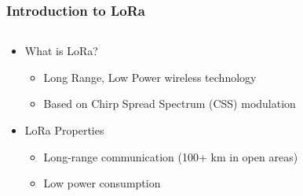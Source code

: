 \documentclass[aspectratio=169]{beamer}
\begin{document}
\begin{frame}[t]
\begin{columns}
\begin{column}{0.33\textwidth}
{      }
    \end{column}
  \end{columns}
\end{frame}

\begin{frame}[t]
  \frametitle{Introduction to LoRa}
  \begin{columns}
    \begin{column}{0.66\textwidth}
      \begin{itemize}
        \item What is LoRa?
        \medskip
        \begin{itemize}
          \item Long Range, Low Power wireless technology
          \medskip
          \item Based on Chirp Spread Spectrum (CSS) modulation
        \end{itemize}
        \medskip
        \item LoRa Properties
        \medskip
        \begin{itemize}
          \item Long-range communication (100+ km in open areas)
          \medskip
          \item Low power consumption
        \end{itemize}
      \end{itemize}
    \end{column}
    \begin{column}{0.33\textwidth}
    \end{column}
  \end{columns}
\end{frame}
\end{document}
